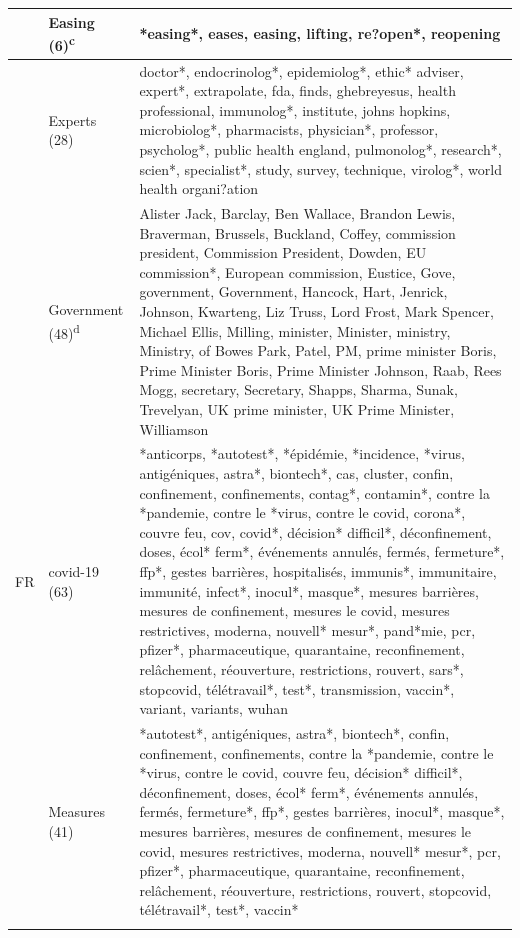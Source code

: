 \documentclass[
]{ccr}
\begin{document}
{\begin{spacing}{.9}
\begin{longtable}[]{@{}
  >{\raggedright\arraybackslash}p{.09\linewidth}
  >{\raggedright\arraybackslash}p{.12\linewidth}
  >{\raggedright\arraybackslash}p{.71\linewidth}@{}}
& Easing (6)\textsuperscript{c} & *easing*, eases, easing, lifting,
re?open*, reopening \\ \cline{2-3}
& Experts (28) & doctor*, endocrinolog*, epidemiolog*, ethic* adviser,
expert*, extrapolate, fda, finds, ghebreyesus, health professional,
immunolog*, institute, johns hopkins, microbiolog*, pharmacists,
physician*, professor, psycholog*, public health england, pulmonolog*,
research*, scien*, specialist*, study, survey, technique, virolog*,
world health organi?ation \\ \cline{2-3}
& Government (48)\textsuperscript{d} & Alister Jack, Barclay, Ben
Wallace, Brandon Lewis, Braverman, Brussels, Buckland, Coffey,
commission president, Commission President, Dowden, EU commission*,
European commission, Eustice, Gove, government, Government, Hancock,
Hart, Jenrick, Johnson, Kwarteng, Liz Truss, Lord Frost, Mark Spencer,
Michael Ellis, Milling, minister, Minister, ministry, Ministry, of Bowes
Park, Patel, PM, prime minister Boris, Prime Minister Boris, Prime
Minister Johnson, Raab, Rees Mogg, secretary, Secretary, Shapps, Sharma,
Sunak, Trevelyan, UK prime minister, UK Prime Minister, Williamson \\ \cline{1-3}

FR & covid-19 (63) & *anticorps, *autotest*, *épidémie, *incidence,
*virus, antigéniques, astra*, biontech*, cas, cluster, confin,
confinement, confinements, contag*, contamin*, contre la *pandemie,
contre le *virus, contre le covid, corona*, couvre feu, cov, covid*,
décision* difficil*, déconfinement, doses, écol* ferm*, événements
annulés, fermés, fermeture*, ffp*, gestes barrières, hospitalisés,
immunis*, immunitaire, immunité, infect*, inocul*, masque*, mesures
barrières, mesures de confinement, mesures le covid, mesures
restrictives, moderna, nouvell* mesur*, pand*mie, pcr, pfizer*,
pharmaceutique, quarantaine, reconfinement, relâchement, réouverture,
restrictions, rouvert, sars*, stopcovid, télétravail*, test*,
transmission, vaccin*, variant, variants, wuhan \\ \cline{2-3}

& Measures (41) & *autotest*, antigéniques, astra*, biontech*, confin,
confinement, confinements, contre la *pandemie, contre le *virus, contre
le covid, couvre feu, décision* difficil*, déconfinement, doses, écol*
ferm*, événements annulés, fermés, fermeture*, ffp*, gestes barrières,
inocul*, masque*, mesures barrières, mesures de confinement, mesures le
covid, mesures restrictives, moderna, nouvell* mesur*, pcr, pfizer*,
pharmaceutique, quarantaine, reconfinement, relâchement, réouverture,
restrictions, rouvert, stopcovid, télétravail*, test*, vaccin* \\ \cline{2-3}


\end{longtable}
\end{spacing}}
\end{document}
